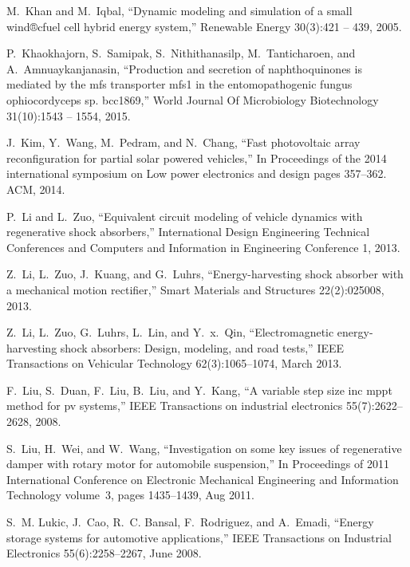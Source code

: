 M.~Khan and M.~Iqbal,
\newblock ``Dynamic modeling and simulation of a small wind®cfuel cell hybrid
  energy system,''
\newblock Renewable Energy 30(3):421 -- 439, 2005.

P.~Khaokhajorn, S.~Samipak, S.~Nithithanasilp, M.~Tanticharoen, and
  A.~Amnuaykanjanasin,
\newblock ``Production and secretion of naphthoquinones is mediated by the mfs
  transporter mfs1 in the entomopathogenic fungus ophiocordyceps sp. bcc1869,''
\newblock World Journal Of Microbiology Biotechnology 31(10):1543 --
  1554, 2015.

J.~Kim, Y.~Wang, M.~Pedram, and N.~Chang,
\newblock ``Fast photovoltaic array reconfiguration for partial solar powered
  vehicles,''
\newblock In Proceedings of the 2014 international symposium on Low power
  electronics and design pages 357--362. ACM, 2014.

P.~Li and L.~Zuo,
\newblock ``Equivalent circuit modeling of vehicle dynamics with regenerative
  shock absorbers,''
\newblock International Design Engineering Technical Conferences and
  Computers and Information in Engineering Conference 1, 2013.

Z.~Li, L.~Zuo, J.~Kuang, and G.~Luhrs,
\newblock ``Energy-harvesting shock absorber with a mechanical motion rectifier,''
\newblock Smart Materials and Structures 22(2):025008, 2013.

Z.~Li, L.~Zuo, G.~Luhrs, L.~Lin, and Y.~x.~Qin,
\newblock ``Electromagnetic energy-harvesting shock absorbers: Design, modeling,
  and road tests,''
\newblock IEEE Transactions on Vehicular Technology 62(3):1065--1074,
  March 2013.

F.~Liu, S.~Duan, F.~Liu, B.~Liu, and Y.~Kang,
\newblock ``A variable step size inc mppt method for pv systems,''
\newblock IEEE Transactions on industrial electronics 55(7):2622--2628,
  2008.

S.~Liu, H.~Wei, and W.~Wang,
\newblock ``Investigation on some key issues of regenerative damper with rotary
  motor for automobile suspension,''
\newblock In Proceedings of 2011 International Conference on Electronic
  Mechanical Engineering and Information Technology volume~3, pages
  1435--1439, Aug 2011.

S.~M. Lukic, J.~Cao, R.~C. Bansal, F.~Rodriguez, and A.~Emadi,
\newblock ``Energy storage systems for automotive applications,''
\newblock IEEE Transactions on Industrial Electronics 55(6):2258--2267,
  June 2008.

